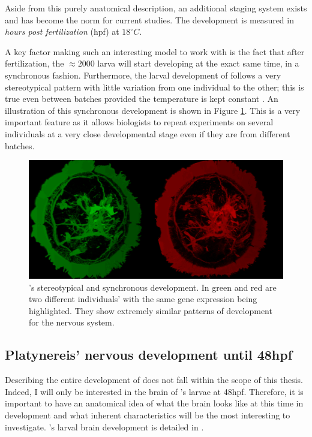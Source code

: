     Aside from this purely anatomical description, an additional staging system exists and has become the norm for current studies. The development is measured in \textit{hours post fertilization} (hpf) at $18^{\circ}C$.
    
    A key factor making \platy{} such an interesting model to work with is the fact that after fertilization, the $\approx 2000$ larva will start developing at the exact same time, in a synchronous fashion. Furthermore, the larval development of \platy{} follows a very stereotypical pattern with little variation from one individual to the other; this is true even between batches provided the temperature is kept constant \cite{fischer04,dorresteijn90}. An illustration of this synchronous development is shown in Figure \ref{fig:brain_comparison}. This is a very important feature as it allows biologists to repeat experiments on several individuals at a very close developmental stage even if they are from different batches.\\
    
\begin{figure}[bth]
  \includegraphics[width=\linewidth]{gfx/chapter1/brain_comparison.png}
  \caption{\platyfull{}'s stereotypical and synchronous development. In green and red are two different \platy{} individuals' with the same gene expression being highlighted. They show extremely similar patterns of development for the nervous system.}
  \label{fig:brain_comparison}
\end{figure}

	 
	  \subsection{Platynereis' nervous development until 48hpf}
	 Describing the entire development of \platy{} does not fall within the scope of this thesis. Indeed, I will only be interested in the brain of \platy{}'s larvae at 48hpf. Therefore, it is important to have an anatomical idea of what the brain looks like at this time in development and what inherent characteristics will be the most interesting to investigate. \platy{}'s larval brain development is detailed in \cite{Fischer10}.\\
	 

